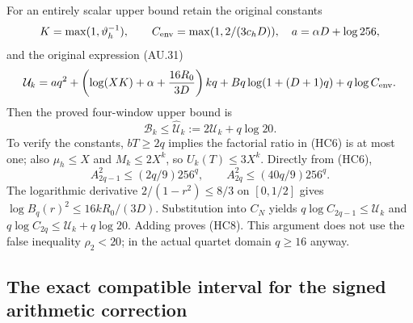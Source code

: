 For an entirely scalar upper bound retain the original constants
\[
 K=\max(1,\vartheta_h^{-1}),\qquad
 C_{\rm env}=\max(1,2/(3c_hD)),\quad a=\alpha D+\log256,
\]
and the original expression (AU.31)
\[
 \mathcal U_k=a q^2+
 \left(\log(XK)+\alpha+\frac{16R_0}{3D}\right)kq
 +Bq\log(1+(D+1)q)+q\log C_{\rm env}.
\]
Then the proved four-window upper bound is
\[
 \boxed{\mathcal B_k\leq\widehat{\mathcal U}_k
 :=2\mathcal U_k+q\log20.}\tag{HC8}
\]
To verify the constants, $bT\geq2q$ implies the factorial ratio in
(HC6) is at most one; also $\mu_h\leq X$ and $M_k\leq2X^k$, so
$U_k(T)\leq3X^k$.  Directly from (HC6),
\[
 A_{2q-1}^2\leq(2q/9)256^q,\qquad
 A_{2q}^2\leq(40q/9)256^q.
\]
The logarithmic derivative $2/(1-r^2)\leq8/3$ on $[0,1/2]$ gives
$\log B_q(r)^2\leq16kR_0/(3D)$.  Substitution into $C_N$ yields
$q\log C_{2q-1}\leq\mathcal U_k$ and
$q\log C_{2q}\leq\mathcal U_k+q\log20$.
Adding proves (HC8).  This argument does not use the false inequality
$\rho_2<20$; in the actual quartet domain $q\geq16$ anyway.

\subsection{The exact compatible interval for the signed arithmetic correction}

